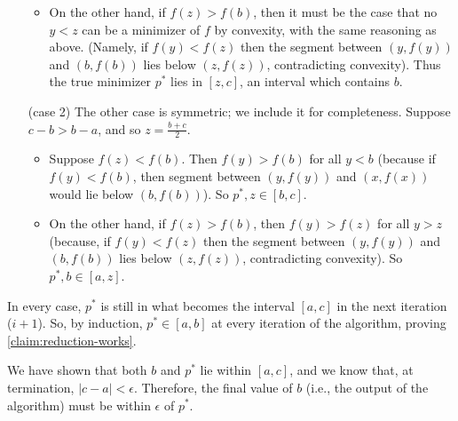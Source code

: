 \begin{lproof}
\begin{itemize}[leftmargin=4em]
\begin{itemize}[leftmargin=-1em]
                \item On the other hand, if $f(z) > f(b)$, then it must be the case that no $y < z$ can be a minimizer of $f$ by convexity, with the same reasoning as above.
                (Namely, if $f(y) < f(z)$ then the segment between $(y,f(y))$ and $(b,f(b))$ lies below $(z,f(z))$, contradicting convexity).
                Thus the true minimizer $p^*$ lies in $[z,c]$, an interval which contains $b$.
            \end{itemize}
            \item [(case 2)] The other case is symmetric; we include it for completeness. Suppose $c-b > b-a$,
                and so $z = \frac{b+c}{2}$.
            \begin{itemize}[leftmargin=-1em]
                \item Suppose $f(z) < f(b)$. Then $f(y) > f(b)$ for  all $y < b$
                (because if $f(y) < f(b)$, then segment between $(y, f(y))$ and $(x, f(x))$ would lie  below $(b, f(b))$).
                So $p^*, z \in [b, c]$.

                \item On the other hand, if $f(z) > f(b)$, then $f(y) > f(z)$ for all $y > z$
                (because, if $f(y) < f(z)$ then the segment between $(y,f(y))$ and $(b,f(b))$ lies below $(z,f(z))$, contradicting convexity).
                So $p^*, b \in [a,z]$. \qedhere
            \end{itemize}
        \end{itemize}
        In every case, $p^*$ is still in what becomes
        the interval $[a,c]$ in the next iteration ($i+1$).
        So, by induction, $p^* \in [a,b]$ at every iteration of the algorithm,
        proving \cref{claim:reduction-works}.
        \qedsymbol

    We have shown that both $b$ and $p^*$ lie within $[a,c]$,
    and we know that, at termination, $|c-a| < \epsilon$.
    Therefore, the final value of $b$ (i.e., the output of the algorithm)
        must be within $\epsilon$ of $p^*$.





\end{lproof}
